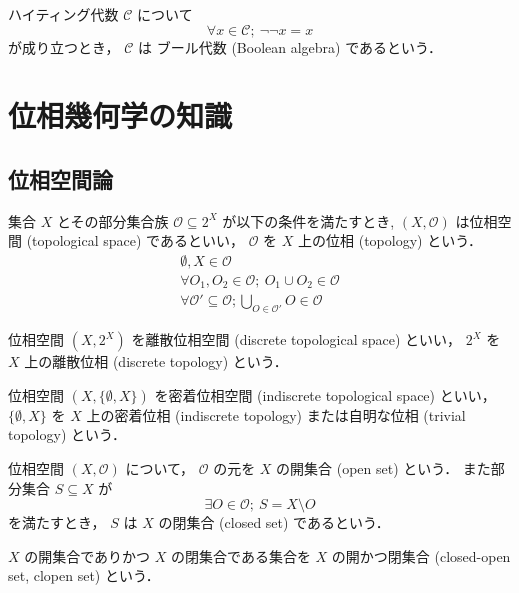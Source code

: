 \documentclass[titlepage]{ltjsreport}
\newcommand{\cat}[1]{\mathscr{#1}}
\newcommand{\objs}[1]{#1}
\begin{document}
\begin{definition}[ブール代数]\label{def:boolean-algebra}
  ハイティング代数 $\cat{C}$ について
  \begin{equation}
    \forall x\in\objs{\cat{C}};\ \neg\neg x=x
  \end{equation}
  が成り立つとき，
  $\cat{C}$ は ブール代数 (Boolean algebra) であるという．
\end{definition}

\chapter{位相幾何学の知識}

\section{位相空間論}

\begin{definition}[位相空間]\label{def:topological-space}
  集合 $X$ とその部分集合族 $\mathcal{O}\subseteq2^X$ が以下の条件を満たすとき,
  $(X,\mathcal{O})$ は位相空間 (topological space) であるといい，
  $\mathcal{O}$ を $X$ 上の位相 (topology) という．
  \begin{align}
    \emptyset,X\in\mathcal{O}                                 \\
    \forall O_1,O_2\in\mathcal{O};\ O_1\cup O_2\in\mathcal{O} \\
    \forall \mathcal{O}'\subseteq\mathcal{O};
    \bigcup_{O\in\mathcal{O}'}O\in\mathcal{O}
  \end{align}
\end{definition}

\begin{definition}[離散位相]
  位相空間 $(X,2^X)$ を離散位相空間 (discrete topological space) といい，
  $2^X$ を $X$ 上の離散位相 (discrete topology) という．
\end{definition}

\begin{definition}[密着位相]
  位相空間 $(X,\{\emptyset,X\})$
  を密着位相空間 (indiscrete topological space) といい，
  $\{\emptyset,X\}$ を $X$ 上の密着位相 (indiscrete topology)
  または自明な位相 (trivial topology) という．
\end{definition}

\begin{definition}
  位相空間 $(X,\mathcal{O})$ について，
  $\mathcal{O}$ の元を $X$ の開集合 (open set) という．
  また部分集合 $S\subseteq X$ が
  \begin{equation}
    \exists O\in\mathcal{O};\ S=X\setminus O
  \end{equation}
  を満たすとき，
  $S$ は $X$ の閉集合 (closed set) であるという．

  $X$ の開集合でありかつ $X$ の閉集合である集合を
  $X$ の開かつ閉集合 (closed-open set, clopen set) という．
\end{definition}
\end{document}
